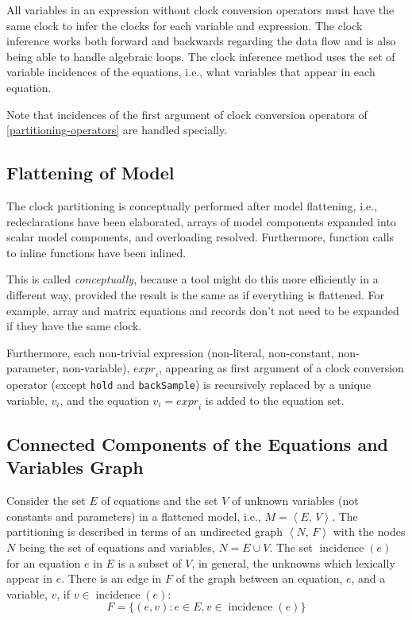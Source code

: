 All variables in an expression without clock conversion operators must
have the same clock to infer the clocks for each variable and
expression. The clock inference works both forward and backwards
regarding the data flow and is also being able to handle algebraic
loops. The clock inference method uses the set of variable incidences of
the equations, i.e., what variables that appear in each equation.

Note that incidences of the first argument of clock conversion operators
of \cref{partitioning-operators} are handled specially.

\subsection{Flattening of Model}\label{flattening-of-model}

The clock partitioning is conceptually performed after model flattening,
i.e., redeclarations have been elaborated, arrays of model components
expanded into scalar model components, and overloading resolved.
Furthermore, function calls to inline functions have been inlined.

\begin{nonnormative}
This is called \emph{conceptually}, because a tool might do this more efficiently in a different way, provided the result is the same as if everything is flattened.  For example,
array and matrix equations and records don't not need to be expanded if they have the same clock.
\end{nonnormative}

Furthermore, each non-trivial expression (non-literal, non-constant, non-parameter, non-variable), $\mathit{expr}_{i}$, appearing as first argument of a clock conversion operator (except \lstinline!hold! and \lstinline!backSample!) is recursively replaced by a unique variable, $v_{i}$, and the equation $v_{i} = \mathit{expr}_{i}$ is added to the equation set.

\subsection{Connected Components of the Equations and Variables Graph}\label{connected-components-of-the-equations-and-variables-graph}

Consider the set $E$ of equations and the set $V$ of unknown variables (not constants and parameters) in a flattened model, i.e., $M = \left\langle E,\, V \right\rangle$.
The partitioning is described in terms of an undirected graph $\left\langle N,\, F \right\rangle$ with the nodes $N$ being the set of equations and variables, $N = E \cup V$.
The set $\operatorname{incidence}(e)$ for an equation $e$ in $E$ is a subset of $V$, in general, the unknowns which lexically appear in $e$.
There is an edge in $F$ of the graph between an equation, $e$, and a variable, $v$, if $v \in \operatorname{incidence}(e)$:
\begin{equation*}
F = \{(e, v) : e \in E, v \in \operatorname{incidence}(e)\}
\end{equation*}

